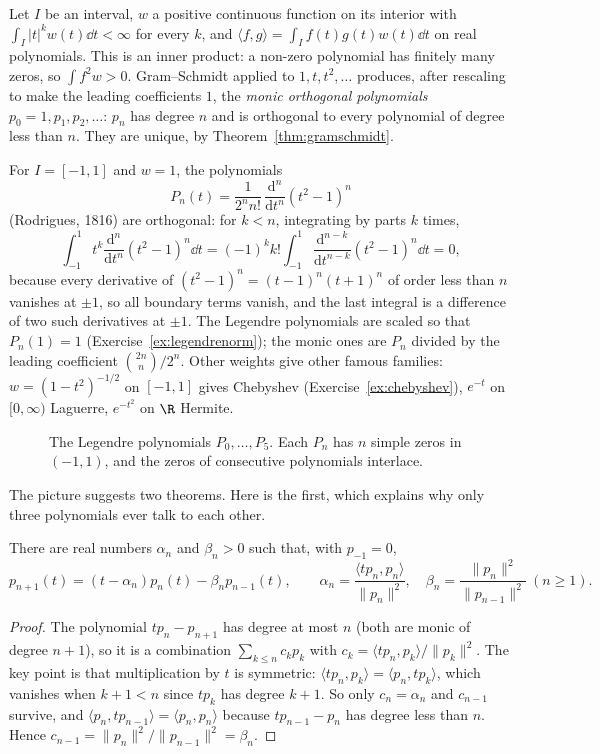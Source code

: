 Let $I$ be an interval, $w$ a positive continuous function on its interior with $\int_I|t|^kw(t)\dd t<\infty$ for every
$k$, and $\langle f,g\rangle=\int_If(t)g(t)w(t)\dd t$ on real polynomials. This is an inner product: a non-zero
polynomial has finitely many zeros, so $\int f^2w>0$. Gram--Schmidt applied to $1,t,t^2,\dots$ produces, after rescaling
to make the leading coefficients $1$, the \emph{monic orthogonal polynomials} $p_0=1,p_1,p_2,\dots$: $p_n$ has degree $n$
and is orthogonal to every polynomial of degree less than $n$. They are unique, by Theorem~\ref{thm:gramschmidt}.

\begin{example}\label{exa:legendre}
For $I=[-1,1]$ and $w=1$, the polynomials
\[
P_n(t)=\frac1{2^nn!}\,\frac{\mathrm d^n}{\mathrm dt^n}(t^2-1)^n
\]
(Rodrigues, 1816) are orthogonal: for $k<n$, integrating by parts $k$ times,
\[
\int_{-1}^1t^k\frac{\mathrm d^n}{\mathrm dt^n}(t^2-1)^n\dd t=(-1)^kk!\int_{-1}^1\frac{\mathrm d^{n-k}}{\mathrm dt^{n-k}}(t^2-1)^n\dd t=0,
\]
because every derivative of $(t^2-1)^n=(t-1)^n(t+1)^n$ of order less than $n$ vanishes at $\pm1$, so all boundary terms
vanish, and the last integral is a difference of two such derivatives at $\pm1$. The Legendre polynomials are scaled so
that $P_n(1)=1$ (Exercise~\ref{ex:legendrenorm}); the monic ones are $P_n$ divided by the leading coefficient
$\binom{2n}n/2^n$. Other weights give other famous families: $w=(1-t^2)^{-1/2}$ on $[-1,1]$ gives Chebyshev
(Exercise~\ref{ex:chebyshev}), $e^{-t}$ on $[0,\infty)$ Laguerre, $e^{-t^2}$ on $\R$ Hermite.
\end{example}

\begin{figure}[ht]
\centering
{}
\caption{The Legendre polynomials $P_0,\dots,P_5$. Each $P_n$ has $n$ simple zeros in $(-1,1)$, and the zeros of
consecutive polynomials interlace.}
\label{fig:legendre}
\end{figure}

The picture suggests two theorems. Here is the first, which explains why only three polynomials ever talk to each other.

\begin{theorem}\label{thm:recurrence}
There are real numbers $\alpha_n$ and $\beta_n>0$ such that, with $p_{-1}=0$,
\[
p_{n+1}(t)=(t-\alpha_n)p_n(t)-\beta_np_{n-1}(t),\qquad \alpha_n=\frac{\langle tp_n,p_n\rangle}{\|p_n\|^2},\quad
\beta_n=\frac{\|p_n\|^2}{\|p_{n-1}\|^2}\ (n\ge1).
\]
\end{theorem}
\begin{proof}
The polynomial $tp_n-p_{n+1}$ has degree at most $n$ (both are monic of degree $n+1$), so it is a combination
$\sum_{k\le n}c_kp_k$ with $c_k=\langle tp_n,p_k\rangle/\|p_k\|^2$. The key point is that multiplication by $t$ is
symmetric: $\langle tp_n,p_k\rangle=\langle p_n,tp_k\rangle$, which vanishes when $k+1<n$ since $tp_k$ has degree $k+1$.
So only $c_n=\alpha_n$ and $c_{n-1}$ survive, and $\langle p_n,tp_{n-1}\rangle=\langle p_n,p_n\rangle$ because
$tp_{n-1}-p_n$ has degree less than $n$. Hence $c_{n-1}=\|p_n\|^2/\|p_{n-1}\|^2=\beta_n$.
\end{proof}

